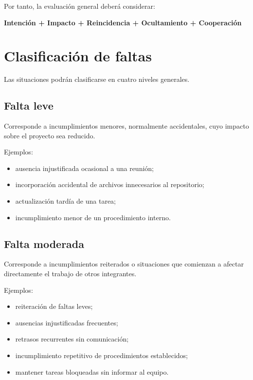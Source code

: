 \documentclass[12pt,a4paper]{article}
\begin{document}
Por tanto, la evaluación general deberá considerar:

\begin{center}
\textbf{Intención + Impacto + Reincidencia + Ocultamiento + Cooperación}
\end{center}

\section{Clasificación de faltas}

Las situaciones podrán clasificarse en cuatro niveles generales.

\subsection{Falta leve}

Corresponde a incumplimientos menores, normalmente accidentales, cuyo impacto sobre el proyecto sea reducido.

Ejemplos:

\begin{itemize}
    \item ausencia injustificada ocasional a una reunión;
    \item incorporación accidental de archivos innecesarios al repositorio;
    \item actualización tardía de una tarea;
    \item incumplimiento menor de un procedimiento interno.
\end{itemize}

\subsection{Falta moderada}

Corresponde a incumplimientos reiterados o situaciones que comienzan a afectar directamente el trabajo de otros integrantes.

Ejemplos:

\begin{itemize}
    \item reiteración de faltas leves;
    \item ausencias injustificadas frecuentes;
    \item retrasos recurrentes sin comunicación;
    \item incumplimiento repetitivo de procedimientos establecidos;
    \item mantener tareas bloqueadas sin informar al equipo.
\end{itemize}
\end{document}
